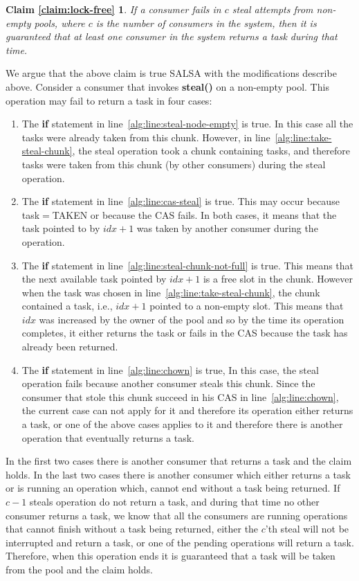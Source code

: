 \newtheorem*{claim:lock-free}{Claim \ref{claim:lock-free}}
\begin{claim:lock-free}
If a consumer fails in $c$ steal attempts from non-empty pools, where $c$ is the number of consumers in the system, then it is guaranteed that at least one consumer in the system returns a task during that time. 
\end{claim:lock-free}

We argue that the above claim is true SALSA with the modifications describe above. Consider a consumer that invokes {\bf steal()} on a non-empty pool. This operation may fail to return a task in four cases:
\begin{enumerate}
 \item The {\bf if} statement in line~\ref{alg:line:steal-node-empty} is true. In this case all the tasks were already taken from this chunk. However, in line~\ref{alg:line:take-steal-chunk}, the steal operation took a chunk containing tasks, and therefore tasks were taken from this chunk (by other consumers) during the steal operation.
 \item The {\bf if} statement in line~\ref{alg:line:cas-steal} is true. This may occur because task$=$TAKEN or because the CAS fails. In both cases, it means that the task pointed to by $idx+1$ was taken by another consumer during the operation.
 \item The {\bf if} statement in line~\ref{alg:line:steal-chunk-not-full} is true. This means that the next available task pointed by $idx+1$ is a free slot in the chunk. However when the task was chosen in line~\ref{alg:line:take-steal-chunk}, the chunk contained a task, i.e., $idx+1$ pointed to a non-empty slot. This means that $idx$ was increased by the owner of the pool and so by the time its operation completes, it either returns the task or fails in the CAS because the task has already been returned.
 \item The {\bf if} statement in line~\ref{alg:line:chown} is true, In this case, the steal operation fails because another consumer steals this chunk. Since the consumer that stole this chunk succeed in his CAS in line~\ref{alg:line:chown}, the current case can not apply for it and therefore its operation either returns a task, or one of the above cases applies to it and therefore there is another operation that eventually returns a task. 
\end{enumerate}

In the first two cases there is another consumer that returns a task and the claim holds. In the last two cases there is another consumer which either returns a task or is running an operation which, cannot end without a task being returned. If $c-1$ steals operation do not return a task, and during that time no other consumer returns a task, we know that all the consumers are running operations that cannot finish without a task being returned, either the $c$'th steal will not be interrupted and return a task, or one of the pending operations will return a task. Therefore, when this operation ends it is guaranteed that a task will be taken from the pool and the claim holds.